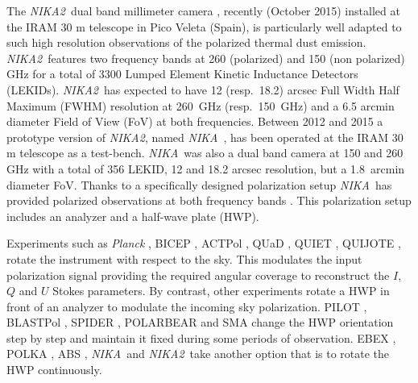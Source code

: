 \documentclass[twocolumn, traditabstract]{aa}
\newcommand{\nika}{{\it NIKA}}
\newcommand{\nikad}{{\it NIKA2}}
\begin{document}
The \nikad\ dual band millimeter camera \citep{Calvo2016,2016arXiv160508628C}, recently
(October 2015) installed at the IRAM 30 m telescope in Pico Veleta (Spain), is
particularly well adapted to such high resolution observations of the
polarized thermal dust emission.  \nikad\ features two frequency bands at 260
(polarized) and 150 (non polarized) GHz for a total of 3300 Lumped
Element Kinetic Inductance Detectors (LEKIDs). \nikad\ has expected to have 12
(resp.~18.2) arcsec Full Width Half Maximum (FWHM) resolution at 260~GHz
  (resp.~150~GHz) and a 6.5 arcmin diameter Field of View (FoV) at both
  frequencies. Between 2012 and 2015 a prototype version of \nikad, named
\nika\ \citep{monfardini2010,catalano2014}, has been operated at the IRAM 30 m
telescope as a test-bench. \nika\ was also a dual band camera at 150 and 260 GHz
with a total of 356 LEKID, 12 and 18.2 arcsec resolution, but a 1.8~arcmin diameter
FoV. Thanks to a specifically designed polarization setup \nika\ has provided
polarized observations at both frequency bands \citep{Ritacco2015}. This
polarization setup includes an analyzer and a half-wave plate (HWP).

Experiments such as {\it Planck} \citep{planck_mission}, BICEP \citep{bicep}, ACTPol
\citep{ACTPOL}, QUaD \citep{QUAD}, QUIET \citep{QUIET}, QUIJOTE \citep{QUIJOTE},
rotate the instrument with respect to the sky. This modulates the input polarization
signal providing the required angular coverage to reconstruct the $I$, $Q$ and $U$
Stokes parameters. By contrast, other experiments rotate a HWP in front of an
analyzer to modulate the incoming sky polarization. PILOT \citep{PILOT},
BLASTPol \citep{BLASTPol}, SPIDER \citep{SPIDER}, POLARBEAR \citep{polarbear}
and SMA \citep{2008SPIE.7020E..2BM} change the HWP orientation step by step and maintain it fixed during some
periods of observation. EBEX \citep{ebex}, POLKA \citep{polka_apex}, ABS \citep{2016arXiv160105901Er}, \nika\ and \nikad\ take another option
that is to rotate the HWP continuously. 
\end{document}
